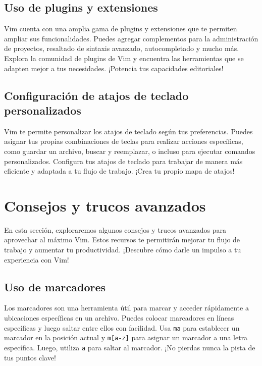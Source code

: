 \documentclass[
  a4paper,
]{article}
\begin{document}
\subsection{Uso de plugins y
extensiones}\label{uso-de-plugins-y-extensiones}

Vim cuenta con una amplia gama de plugins y extensiones que te permiten
ampliar sus funcionalidades. Puedes agregar complementos para la
administración de proyectos, resaltado de sintaxis avanzado,
autocompletado y mucho más. Explora la comunidad de plugins de Vim y
encuentra las herramientas que se adapten mejor a tus necesidades.
¡Potencia tus capacidades editoriales!

\subsection{Configuración de atajos de teclado
personalizados}\label{configuraciuxf3n-de-atajos-de-teclado-personalizados}

Vim te permite personalizar los atajos de teclado según tus
preferencias. Puedes asignar tus propias combinaciones de teclas para
realizar acciones específicas, como guardar un archivo, buscar y
reemplazar, o incluso para ejecutar comandos personalizados. Configura
tus atajos de teclado para trabajar de manera más eficiente y adaptada a
tu flujo de trabajo. ¡Crea tu propio mapa de atajos!

\section{Consejos y trucos avanzados}\label{consejos-y-trucos-avanzados}

En esta sección, exploraremos algunos consejos y trucos avanzados para
aprovechar al máximo Vim. Estos recursos te permitirán mejorar tu flujo
de trabajo y aumentar tu productividad. ¡Descubre cómo darle un impulso
a tu experiencia con Vim!

\subsection{Uso de marcadores}\label{uso-de-marcadores}

Los marcadores son una herramienta útil para marcar y acceder
rápidamente a ubicaciones específicas en un archivo. Puedes colocar
marcadores en líneas específicas y luego saltar entre ellos con
facilidad. Usa \texttt{ma} para establecer un marcador en la posición
actual y \texttt{m{[}a-z{]}} para asignar un marcador a una letra
específica. Luego, utiliza \texttt{\textquotesingle{}a} para saltar al
marcador. ¡No pierdas nunca la pista de tus puntos clave!
\end{document}
